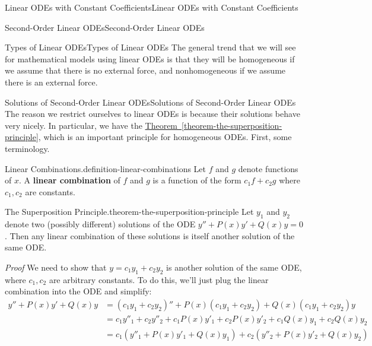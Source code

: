 \documentclass[10pt,]{book}
\makeatletter
\newcommand{\terminology}[1]{\textbf{#1}}
\renewcommand*{\proofname}{Proof}
\renewenvironment{proof}[1][\proofname]{\par
  \pushQED{\qed}%
  \normalfont \topsep6\p@\@plus6\p@\relax
  \trivlist
  \item\relax
    {\itshape
    #1\@addpunct{.}}\hspace\labelsep\ignorespaces
}{%
  \popQED\endtrivlist\@endpefalse
}
\numberwithin{equation}{section}
\newcommand{\amp}{&}
\makeatother
\begin{document}
\begin{chapterptx}{Linear ODEs with Constant Coefficients}{}{Linear ODEs with Constant Coefficients}{}{}
\begin{sectionptx}{Second-Order Linear ODEs}{}{Second-Order Linear ODEs}{}{}
\begin{subsectionptx}{Types of Linear ODEs}{}{Types of Linear ODEs}{}{}
\hypertarget{p-153}{}%
The general trend that we will see for mathematical models using linear ODEs is that they will be homogeneous if we assume that there is no external force, and nonhomogeneous if we assume there is an external force.%
\end{subsectionptx}
%
%
\typeout{************************************************}
\typeout{************************************************}
%
\begin{subsectionptx}{Solutions of Second-Order Linear ODEs}{}{Solutions of Second-Order Linear ODEs}{}{}\label{subsection-solutions-of-second-order-linear-ODEs}
\hypertarget{p-154}{}%
The reason we restrict ourselves to linear ODEs is because their solutions behave very nicely. In particular, we have the \hyperref[theorem-the-superposition-principle]{Theorem~\ref{theorem-the-superposition-principle}}, which is an important principle for homogeneous ODEs. First, some terminology.%
\begin{definition}{Linear Combinations.}{definition-linear-combinations}%
\hypertarget{p-155}{}%
Let \(f\) and \(g\) denote functions of \(x\). A \terminology{linear combination} of \(f\) and \(g\) is a function of the form \(c_{1}f+c_{2}g\) where \(c_{1},c_{2}\) are constants.%
\end{definition}
\begin{theorem}{The Superposition Principle.}{}{theorem-the-superposition-principle}%
\hypertarget{p-156}{}%
Let \(y_{1}\) and \(y_{2}\) denote two (possibly different) solutions of the ODE \(y''+P(x)y'+Q(x)y = 0\). Then any linear combination of these solutions is itself another solution of the same ODE.%
\end{theorem}
\begin{proof}\hypertarget{proof-1}{}
\hypertarget{p-157}{}%
We need to show that \(y = c_{1}y_{1} + c_{2}y_{2}\) is another solution of the same ODE, where \(c_{1},c_{2}\) are arbitrary constants. To do this, we'll just plug the linear combination into the ODE and simplify:%
\begin{align*}
y''+P(x)y'+Q(x)y \amp = (c_{1}y_{1}+c_{2}y_{2})''+P(x)(c_{1}y_{1}+c_{2}y_{2})+Q(x)(c_{1}y_{1}+c_{2}y_{2})y \\
\amp = c_{1}y''_{1}+c_{2}y''_{2} + c_{1}P(x)y'_{1}+c_{2}P(x)y'_{2} + c_{1}Q(x)y_{1} + c_{2}Q(x)y_{2}\\
\amp = c_{1}(y''_{1}+P(x)y'_{1}+Q(x)y_{1}) + c_{2}(y''_{2}+P(x)y'_{2}+Q(x)y_{2}) \\

\end{align*}
\end{proof}
\end{subsectionptx}
\end{sectionptx}
\end{chapterptx}
\end{document}
